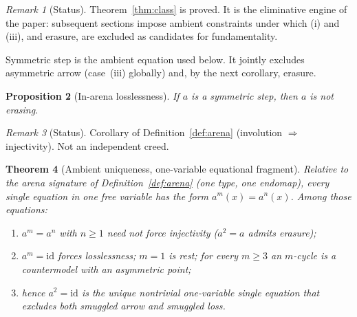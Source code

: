 \documentclass[11pt,a4paper]{article}
\theoremstyle{plain}
\newtheorem{theorem}{Theorem}[section]
\newtheorem{proposition}[theorem]{Proposition}
\theoremstyle{definition}
\theoremstyle{remark}
\newtheorem{remark}[theorem]{Remark}
\begin{document}
\begin{center}
\end{center}

\begin{remark}[Status]
Theorem~\ref{thm:class} is proved. It is the eliminative engine of the
paper: subsequent sections impose ambient constraints under which (i)
and (iii), and erasure, are excluded as candidates for fundamentality.
\end{remark}

Symmetric step is the ambient equation used below. It jointly excludes
asymmetric arrow (case~(iii) globally) and, by the next corollary,
erasure.

\begin{proposition}[In-arena losslessness]
\label{prop:no-erase}
If $a$ is a symmetric step, then $a$ is not erasing.
\end{proposition}

\begin{remark}[Status]
Corollary of Definition~\ref{def:arena} (involution $\Rightarrow$
injectivity). Not an independent creed.
\end{remark}

\begin{theorem}[Ambient uniqueness, one-variable equational fragment]
\label{thm:ambient-unique}
Relative to the arena signature of Definition~\ref{def:arena} (one type,
one endomap), every single equation in one free variable has the form
$a^{m}(x)=a^{n}(x)$. Among those equations:
\begin{enumerate}[label=(\roman*)]
\item $a^{m}=a^{n}$ with $n\ge 1$ need not force injectivity
($a^{2}=a$ admits erasure);
\item $a^{m}=\mathrm{id}$ forces losslessness; $m=1$ is rest; for every
$m\ge 3$ an $m$-cycle is a countermodel with an asymmetric point;
\item hence $a^{2}=\mathrm{id}$ is the unique nontrivial one-variable
single equation that excludes both smuggled arrow and smuggled loss.
\end{enumerate}
\end{theorem}
\end{document}
